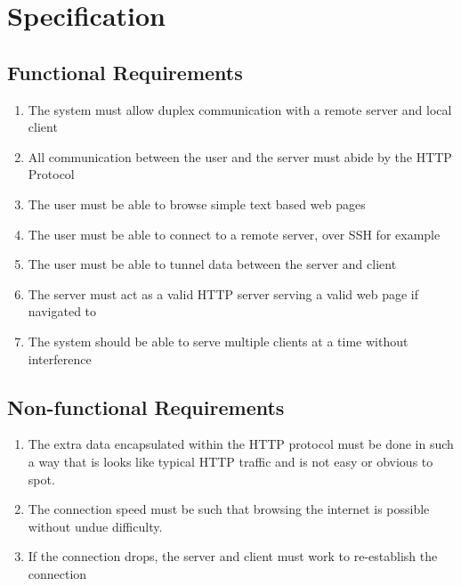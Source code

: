\section{Specification}
\subsection{Functional Requirements}
\begin{enumerate}
    \item The system must allow duplex communication with a remote server and local client
    \item All communication between the user and the server must abide by the HTTP Protocol
    \item The user must be able to browse simple text based web pages
    \item The user must be able to connect to a remote server, over SSH for example
    \item The user must be able to tunnel data between the server and client
    \item The server must act as a valid HTTP server serving a valid web page if navigated to
    \item The system should be able to serve multiple clients at a time without interference
\end{enumerate}
\subsection{Non-functional Requirements}
\begin{enumerate}
    \item The extra data encapsulated within the HTTP protocol must be done in such a way that is looks like typical HTTP traffic and is not easy or obvious to spot.
    \item The connection speed must be such that browsing the internet is possible without undue difficulty.
    \item If the connection drops, the server and client must work to re-establish the connection
\end{enumerate}
